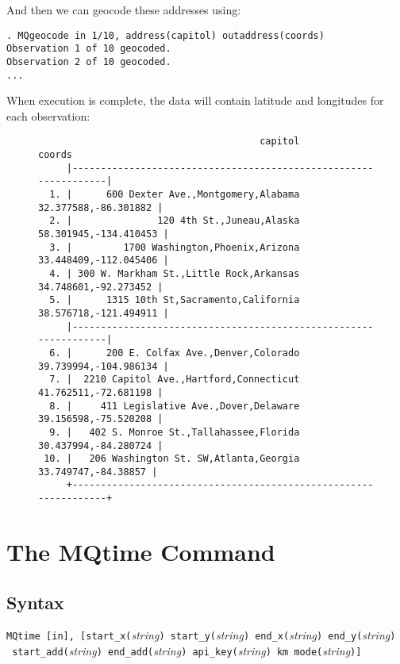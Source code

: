 \documentclass[12pt]{article}
\begin{document}
And then we can geocode these addresses using: 
\begin{verbatim}
. MQgeocode in 1/10, address(capitol) outaddress(coords)
Observation 1 of 10 geocoded.
Observation 2 of 10 geocoded.
...
\end{verbatim}
When execution is complete, the data will contain latitude and longitudes for each observation:
\begin{figure}[ht]
\begin{verbatim}
                                       capitol                  coords 
     |-----------------------------------------------------------------|
  1. |      600 Dexter Ave.,Montgomery,Alabama    32.377588,-86.301882 |
  2. |               120 4th St.,Juneau,Alaska   58.301945,-134.410453 |
  3. |         1700 Washington,Phoenix,Arizona   33.448409,-112.045406 |
  4. | 300 W. Markham St.,Little Rock,Arkansas    34.748601,-92.273452 |
  5. |      1315 10th St,Sacramento,California   38.576718,-121.494911 |
     |-----------------------------------------------------------------|
  6. |      200 E. Colfax Ave.,Denver,Colorado   39.739994,-104.986134 |
  7. |  2210 Capitol Ave.,Hartford,Connecticut    41.762511,-72.681198 |
  8. |     411 Legislative Ave.,Dover,Delaware    39.156598,-75.520208 |
  9. |   402 S. Monroe St.,Tallahassee,Florida    30.437994,-84.280724 |
 10. |   206 Washington St. SW,Atlanta,Georgia     33.749747,-84.38857 |
     +-----------------------------------------------------------------+
\end{verbatim}
\end{figure}

\section{The MQtime Command}

\subsection{Syntax}

\verb|MQtime [in], [start_x(|\textit{string}\verb|) start_y(|\textit{string}\verb|) end_x(|\textit{string}\verb|) end_y(|\textit{string}\verb|)| \\\verb| start_add(|\textit{string}\verb|) end_add(|\textit{string}\verb|) api_key(|\textit{string}\verb|) km mode(|\textit{string}\verb|)]|
\end{document}

